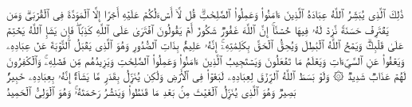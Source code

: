 \stopbuffer%
\startbuffer[\q:42:23]
ذَٰلِكَ ٱلَّذِی یُبَشِّرُ ٱللَّهُ عِبَادَهُ ٱلَّذِینَ ءَامَنُوا۟ وَعَمِلُوا۟ ٱلصَّٰلِحَٰتِۗ قُل لَّاۤ أَسۡءَلُكُمۡ عَلَیۡهِ أَجۡرًا إِلَّا ٱلۡمَوَدَّةَ فِی ٱلۡقُرۡبَىٰۗ وَمَن یَقۡتَرِفۡ حَسَنَةࣰ نَّزِدۡ لَهُۥ فِیهَا حُسۡنًاۚ إِنَّ ٱللَّهَ غَفُورࣱ شَكُورٌ%
\stopbuffer%
\startbuffer[\q:42:24]
أَمۡ یَقُولُونَ ٱفۡتَرَىٰ عَلَى ٱللَّهِ كَذِبࣰاۖ فَإِن یَشَإِ ٱللَّهُ یَخۡتِمۡ عَلَىٰ قَلۡبِكَۗ وَیَمۡحُ ٱللَّهُ ٱلۡبَٰطِلَ وَیُحِقُّ ٱلۡحَقَّ بِكَلِمَٰتِهِۦۤۚ إِنَّهُۥ عَلِیمُۢ بِذَاتِ ٱلصُّدُورِ%
\stopbuffer%
\startbuffer[\q:42:25]
وَهُوَ ٱلَّذِی یَقۡبَلُ ٱلتَّوۡبَةَ عَنۡ عِبَادِهِۦ وَیَعۡفُوا۟ عَنِ ٱلسَّیِّءَاتِ وَیَعۡلَمُ مَا تَفۡعَلُونَ%
\stopbuffer%
\startbuffer[\q:42:26]
وَیَسۡتَجِیبُ ٱلَّذِینَ ءَامَنُوا۟ وَعَمِلُوا۟ ٱلصَّٰلِحَٰتِ وَیَزِیدُهُم مِّن فَضۡلِهِۦۚ وَٱلۡكَٰفِرُونَ لَهُمۡ عَذَابࣱ شَدِیدࣱ%
\stopbuffer%
\startbuffer[\q:42:27]
۞ وَلَوۡ بَسَطَ ٱللَّهُ ٱلرِّزۡقَ لِعِبَادِهِۦ لَبَغَوۡا۟ فِی ٱلۡأَرۡضِ وَلَٰكِن یُنَزِّلُ بِقَدَرࣲ مَّا یَشَاۤءُۚ إِنَّهُۥ بِعِبَادِهِۦ خَبِیرُۢ بَصِیرࣱ%
\stopbuffer%
\startbuffer[\q:42:28]
وَهُوَ ٱلَّذِی یُنَزِّلُ ٱلۡغَیۡثَ مِنۢ بَعۡدِ مَا قَنَطُوا۟ وَیَنشُرُ رَحۡمَتَهُۥۚ وَهُوَ ٱلۡوَلِیُّ ٱلۡحَمِیدُ%
\stopbuffer%
